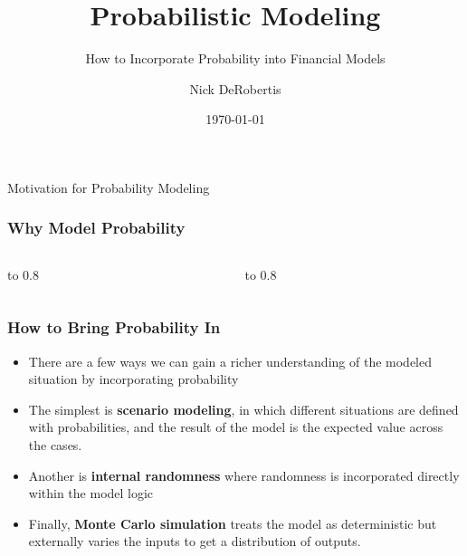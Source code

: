 \documentclass[handout, 11pt]{beamer}
\institute[UF]{\inst{1}
University of Florida\\
Department of Finance, Insurance, and Real Estate}
\begin{document}
\title[Probability]{Probabilistic Modeling}
\subtitle{How to Incorporate Probability into Financial Models}
\author[DeRobertis]{Nick DeRobertis}
\date{\today}
\begin{frame}
\titlepage
\label{title-frame}
\end{frame}
\begin{section}[Intro]{Motivation for Probability Modeling}
\begin{frame}
\frametitle{Why Model Probability}
\begin{columns}
\begin{column}{0.5\textwidth}
\vbox to 0.8
\end{column}
\begin{column}{0.5\textwidth}
\vbox to 0.8
\end{column}
\end{columns}
\end{frame}
\begin{frame}
\frametitle{How to Bring Probability In}
\begin{itemize}
\item There are a few ways we can gain a richer understanding of the modeled situation by incorporating probability
\vfill
\item The simplest is \textbf{scenario modeling}, in which different situations are defined with probabilities, and the result of the model is the expected value across the cases.
\vfill
\item Another is
\textbf{internal randomness}
where randomness is incorporated directly within the model logic
\vfill
\item Finally,
\textbf{Monte Carlo simulation}
treats the model as deterministic but externally varies the inputs to get a distribution of outputs.
\end{itemize}
\end{frame}
\end{section}
\end{document}
